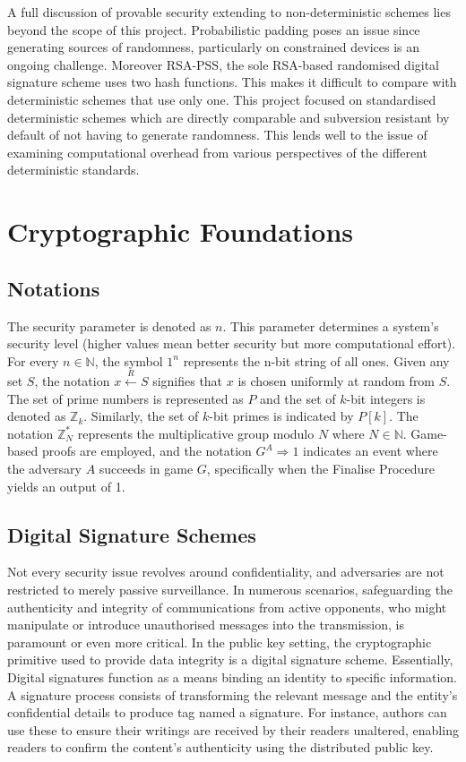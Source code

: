 \documentclass[]{final_report}
\theoremstyle{definition}
\begin{document}
A full discussion of provable security extending to non-deterministic schemes lies beyond the scope of this project. Probabilistic padding poses an issue since generating sources of randomness, particularly on constrained devices is an ongoing challenge. Moreover RSA-PSS, the sole RSA-based randomised digital signature scheme uses two hash functions. This makes it difficult to compare with deterministic schemes that use only one. This project focused on standardised deterministic schemes which are directly comparable and subversion resistant \cite{ateniese2015subversion} by default of not having to generate randomness. This lends well to the issue of examining computational overhead from various perspectives of the different deterministic standards.



\chapter{Cryptographic Foundations}
\section{Notations}
The security parameter is denoted as \( n \). This parameter determines a system's security level (higher values mean better security but more computational effort). For every \( n \in \mathbb{N} \), the symbol \( 1^n \) represents the n-bit string of all ones. Given any set \( S \), the notation \( x \stackrel{R}{\leftarrow} S \) signifies that \( x \) is chosen uniformly at random from \( S \).  The set of prime numbers is represented as \( P \) and the set of \( k \)-bit integers is denoted as \( \mathbb{Z}_k \). Similarly, the set of \( k \)-bit primes is indicated by \( P[k] \). The notation \( \mathbb{Z}_N^* \) represents the multiplicative group modulo \( N \) where \( N \in \mathbb{N} \). Game-based proofs are employed, and the notation \( G^A \Rightarrow 1 \) indicates an event where the adversary \( A \) succeeds in game \( G \), specifically when the Finalise Procedure yields an output of 1.


\section{Digital Signature Schemes}
Not every security issue revolves around confidentiality, and adversaries are not restricted to merely passive surveillance. In numerous scenarios, safeguarding the authenticity and integrity of communications from active opponents, who might manipulate or introduce unauthorised messages into the transmission, is paramount or even more critical. In the public key setting, the cryptographic primitive used to provide data integrity is a digital signature scheme. Essentially, Digital signatures function as a means binding an identity to specific information. A signature process consists of transforming the relevant message and the entity's confidential details to produce tag named a signature. 
For instance, authors can use these to ensure their writings are received by their readers unaltered, enabling readers to confirm the content's authenticity using the distributed public key.
\end{document}
